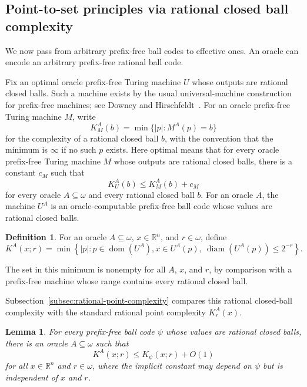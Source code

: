 \documentclass[a4paper,oneside,reqno,12pt]{amsart}
\theoremstyle{plain}
\newtheorem{lemma}[theorem]{Lemma}
\theoremstyle{definition}
\newtheorem{definition}[theorem]{Definition}
\theoremstyle{remark}
\DeclareMathOperator{\dom}{dom}
\DeclareMathOperator{\diam}{diam}
\begin{document}
\subsection{Point-to-set principles via rational closed ball complexity}

We now pass from arbitrary prefix-free ball codes to effective ones.
An oracle can encode an arbitrary prefix-free rational ball code.

Fix an optimal oracle prefix-free Turing machine \(U\) whose outputs are
rational closed balls.
Such a machine exists by the usual universal-machine
construction for prefix-free machines; see Downey and
Hirschfeldt~\cite[Proposition~3.5.1]{DowneyHirschfeldt2010}.
For an oracle prefix-free Turing machine \(M\), write
\[
K_M^A(b)
=
\min\{|p|:M^A(p)=b\}
\]
for the complexity of a rational closed ball \(b\), with the convention
that the minimum is \(\infty\) if no such \(p\) exists.  Here optimal means that
for every oracle prefix-free Turing machine \(M\) whose outputs are rational
closed balls, there is a constant \(c_M\) such that
\[
K_U^A(b)\le K_M^A(b)+c_M
\]
for every oracle \(A\subseteq\omega\) and every rational closed ball \(b\).
For an oracle \(A\), the machine \(U^A\) is an oracle-computable prefix-free ball
code whose values are rational closed balls.


\begin{definition}
\label{def:effective-ball-complexity}
For an oracle \(A\subseteq\omega\), \(x\in\mathbb R^n\), and \(r\in\omega\), define
\[
K^A(x;r)
=
\min\left\{
|p|:
p\in\dom(U^A),
x\in U^A(p),\
\diam(U^A(p))\le 2^{-r}
\right\}.
\]
\end{definition}

The set in this minimum is nonempty for all \(A\), \(x\), and \(r\), by
comparison with a prefix-free machine whose range contains every rational
closed ball.

Subsection~\ref{subsec:rational-point-complexity} compares this rational
closed-ball complexity with the standard rational point complexity
\(K^A_r(x)\).

\begin{lemma}
\label{lem:oracle-simulates-rational-ball-code}
For every prefix-free ball code \(\psi\) whose values are rational closed balls,
there is an oracle \(A\subseteq\omega\) such that
\[
K^A(x;r)
\le
K_\psi(x;r)+O(1)
\]
for all \(x\in\mathbb R^n\) and \(r\in\omega\), where the implicit
constant may depend on \(\psi\) but is independent of \(x\) and \(r\).
\end{lemma}
\end{document}
